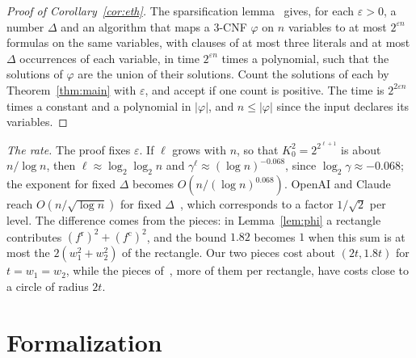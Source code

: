 \documentclass[11pt]{article}
\begin{document}
\begin{proof}[Proof of Corollary~\ref{cor:eth}]
The sparsification lemma~\cite{IPZ01} gives, for each $\varepsilon>0$, a number $\Delta$ and an algorithm that maps a 3-CNF $\varphi$ on $n$ variables to at most $2^{\varepsilon n}$ formulas on the same variables, with clauses of at most three literals and at most $\Delta$ occurrences of each variable, in time $2^{\varepsilon n}$ times a polynomial, such that the solutions of $\varphi$ are the union of their solutions. Count the solutions of each by Theorem~\ref{thm:main} with $\varepsilon$, and accept if one count is positive. The time is $2^{2\varepsilon n}$ times a constant and a polynomial in $|\varphi|$, and $n\le|\varphi|$ since the input declares its variables.
\end{proof}

\emph{The rate.} The proof fixes $\varepsilon$. If $\ell$ grows with $n$, so that $K_0^2=2^{2^{\ell+1}}$ is about $n/\log n$, then $\ell\approx\log_2\log_2n$ and $\gamma^\ell\approx(\log n)^{-0.068}$, since $\log_2\gamma\approx-0.068$; the exponent for fixed $\Delta$ becomes $O(n/(\log n)^{0.068})$. OpenAI and Claude reach $O(n/\sqrt{\log n})$ for fixed $\Delta$~\cite{OAI26,Cla26}, which corresponds to a factor $1/\sqrt2$ per level. The difference comes from the pieces: in Lemma~\ref{lem:phi} a rectangle contributes $(f^{\mathrm r})^2+(f^{\mathrm c})^2$, and the bound $1.82$ becomes $1$ when this sum is at most the $2(w_1^2+w_2^2)$ of the rectangle. Our two pieces cost about $(2t,1.8t)$ for $t=w_1=w_2$, while the pieces of~\cite[Appendix~B]{Cla26}, more of them per rectangle, have costs close to a circle of radius $2t$.

\section{Formalization}\label{sec:formal}
\end{document}
